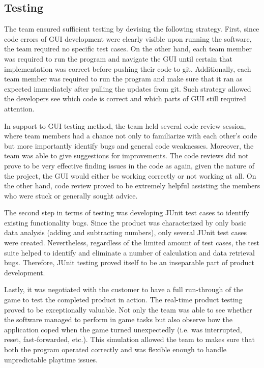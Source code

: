 \documentclass{l3proj}
\begin{document}
\subsection{Testing}
The team ensured sufficient testing by devising the following strategy. First, since code errors of GUI development were clearly visible upon running the 
software, the team required no specific test cases. On the other hand, each team member was required to run the program and navigate the GUI until certain 
that implementation was correct before pushing their code to git. Additionally, each team member was required to run the program and make sure that it ran 
as expected immediately after pulling the updates from git. Such strategy allowed the developers see which code is correct and which parts of GUI still 
required attention.

In support to GUI testing method, the team held several code review session, where team members had a chance not only to familiarize with each other's code 
but more importantly identify bugs and general code weaknesses. Moreover, the team was able to give suggestions for improvements. The code reviews did not 
prove to be very effective finding issues in the code as again, given the nature of the project, the GUI would either be working correctly or not working 
at all. On the other hand, code review proved to be extremely helpful assisting the members who were stuck or generally sought advice.

The second step in terms of testing was developing JUnit test cases to identify existing functionality bugs. Since the product was characterized by only 
basic data analysis (adding and subtracting numbers), only several JUnit test cases were created. Nevertheless, regardless of the limited amount of test 
cases, the test suite helped to identify and eliminate a number of calculation and data retrieval bugs. Therefore, JUnit testing proved itself to be an 
inseparable part of product development.

Lastly, it was negotiated with the customer to have a full run-through of the game to test the completed product in action. The real-time product testing 
proved to be exceptionally valuable. 
Not only the team was able to see whether the software managed to perform in game tasks but also observe how the application coped when the game turned 
unexpectedly (i.e. was interrupted, reset, fast-forwarded, etc.). This simulation allowed the team to makes sure that both the program operated correctly 
and was flexible enough to handle unpredictable playtime issues.
\end{document}
